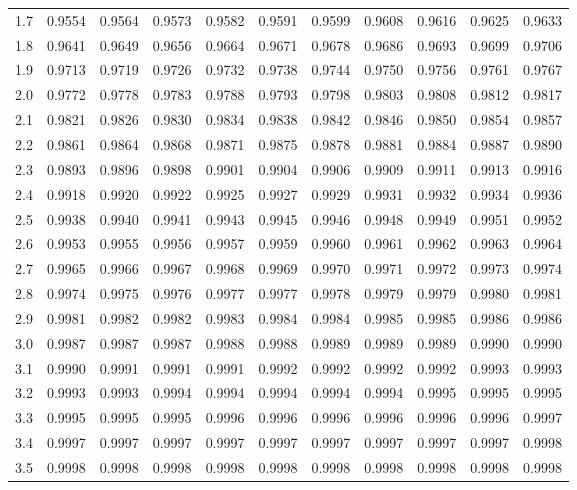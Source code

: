 \begin{table}
{\begin{tabular}{|T{1.1}|T{1.4}|T{1.4}|T{1.4}|T{1.4}|T{1.4}|T{1.4}|T{1.4}|T{1.4}|T{1.4}|T{1.4}|}
1.7 & 0.9554 & 0.9564 & 0.9573 & 0.9582 & 0.9591 & 0.9599 & 0.9608 & 0.9616 & 0.9625 & 0.9633 \\
1.8 & 0.9641 & 0.9649 & 0.9656 & 0.9664 & 0.9671 & 0.9678 & 0.9686 & 0.9693 & 0.9699 & 0.9706 \\
1.9 & 0.9713 & 0.9719 & 0.9726 & 0.9732 & 0.9738 & 0.9744 & 0.9750 & 0.9756 & 0.9761 & 0.9767 \\
2.0 & 0.9772 & 0.9778 & 0.9783 & 0.9788 & 0.9793 & 0.9798 & 0.9803 & 0.9808 & 0.9812 & 0.9817 \\
2.1 & 0.9821 & 0.9826 & 0.9830 & 0.9834 & 0.9838 & 0.9842 & 0.9846 & 0.9850 & 0.9854 & 0.9857 \\
2.2 & 0.9861 & 0.9864 & 0.9868 & 0.9871 & 0.9875 & 0.9878 & 0.9881 & 0.9884 & 0.9887 & 0.9890 \\
2.3 & 0.9893 & 0.9896 & 0.9898 & 0.9901 & 0.9904 & 0.9906 & 0.9909 & 0.9911 & 0.9913 & 0.9916 \\
2.4 & 0.9918 & 0.9920 & 0.9922 & 0.9925 & 0.9927 & 0.9929 & 0.9931 & 0.9932 & 0.9934 & 0.9936 \\
2.5 & 0.9938 & 0.9940 & 0.9941 & 0.9943 & 0.9945 & 0.9946 & 0.9948 & 0.9949 & 0.9951 & 0.9952 \\
2.6 & 0.9953 & 0.9955 & 0.9956 & 0.9957 & 0.9959 & 0.9960 & 0.9961 & 0.9962 & 0.9963 & 0.9964 \\
2.7 & 0.9965 & 0.9966 & 0.9967 & 0.9968 & 0.9969 & 0.9970 & 0.9971 & 0.9972 & 0.9973 & 0.9974 \\
2.8 & 0.9974 & 0.9975 & 0.9976 & 0.9977 & 0.9977 & 0.9978 & 0.9979 & 0.9979 & 0.9980 & 0.9981 \\
2.9 & 0.9981 & 0.9982 & 0.9982 & 0.9983 & 0.9984 & 0.9984 & 0.9985 & 0.9985 & 0.9986 & 0.9986 \\
3.0 & 0.9987 & 0.9987 & 0.9987 & 0.9988 & 0.9988 & 0.9989 & 0.9989 & 0.9989 & 0.9990 & 0.9990 \\
3.1 & 0.9990 & 0.9991 & 0.9991 & 0.9991 & 0.9992 & 0.9992 & 0.9992 & 0.9992 & 0.9993 & 0.9993 \\
3.2 & 0.9993 & 0.9993 & 0.9994 & 0.9994 & 0.9994 & 0.9994 & 0.9994 & 0.9995 & 0.9995 & 0.9995 \\
3.3 & 0.9995 & 0.9995 & 0.9995 & 0.9996 & 0.9996 & 0.9996 & 0.9996 & 0.9996 & 0.9996 & 0.9997 \\
3.4 & 0.9997 & 0.9997 & 0.9997 & 0.9997 & 0.9997 & 0.9997 & 0.9997 & 0.9997 & 0.9997 & 0.9998 \\
3.5 & 0.9998 & 0.9998 & 0.9998 & 0.9998 & 0.9998 & 0.9998 & 0.9998 & 0.9998 & 0.9998 & 0.9998 \\

\end{tabular}}
\end{table}
